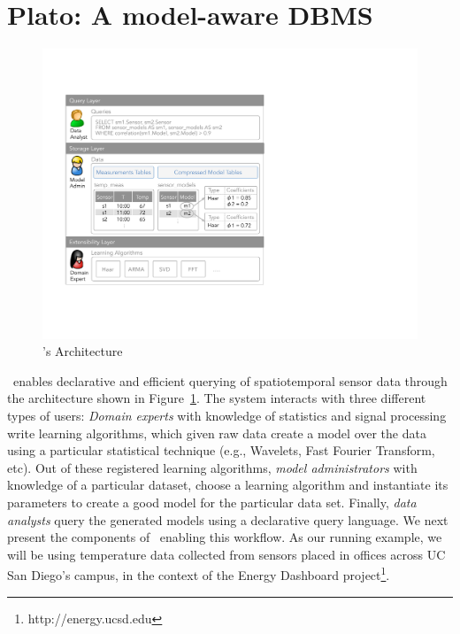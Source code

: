 \section{Plato: A model-aware DBMS}
\label{sec:architecture}

\begin{figure}
\center
\includegraphics[width=\columnwidth]{fig-architecture2.pdf}
\caption{\projName's Architecture}
\label{fig:basic-architecture}
\vspace{-0.4cm}
\end{figure}

\projName\ enables declarative and efficient querying of spatiotemporal sensor data through the architecture shown in Figure~\ref{fig:basic-architecture}. The system interacts with three different types of users: \emph{Domain experts} with knowledge of statistics and signal processing write learning algorithms, which given raw data create a model over the data using a particular statistical technique (e.g., Wavelets, Fast Fourier Transform, etc).
Out of these registered learning algorithms, \emph{model administrators} with knowledge of a particular dataset, choose a learning algorithm and instantiate its parameters to create a good model for the particular data set. Finally, \emph{data analysts} query the generated models using a declarative query language. We next present the components of \projName\ enabling this workflow. As our running example, we will be using temperature data collected from sensors placed in offices across UC San Diego's campus, in the context of the Energy Dashboard project\footnote{http://energy.ucsd.edu}.

